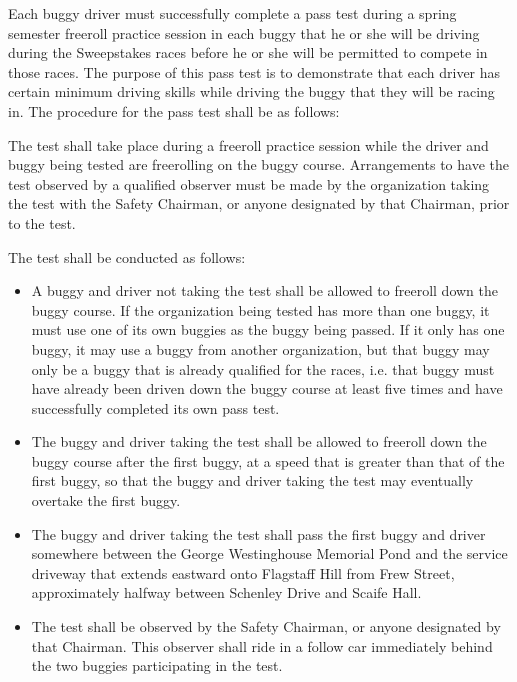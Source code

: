 	Each buggy driver must successfully complete a pass test during a spring
	semester freeroll practice session in each buggy that he or she will be driving
	during the Sweepstakes races before he or she will be permitted to compete in
	those races. The purpose of this pass test is to demonstrate that each driver
	has certain minimum driving skills while driving the buggy that they will be
	racing in. The procedure for the pass test shall be as follows:

	The test shall take place during a freeroll practice session while the driver
	and buggy being tested are freerolling on the buggy course. Arrangements to
	have the test observed by a qualified observer must be made by the organization
	taking the test with the Safety Chairman, or anyone designated by that
	Chairman, prior to the test.

	The test shall be conducted as follows:

	\begin{itemize}

		\item A buggy and driver not taking the test shall be allowed to freeroll
		down the buggy course. If the organization being tested has more than one
		buggy, it must use one of its own buggies as the buggy being passed. If it only
		has one buggy, it may use a buggy from another organization, but that buggy may
		only be a buggy that is already qualified for the races, i.e. that buggy must
		have already been driven down the buggy course at least five times and have
		successfully completed its own pass test.

		\item The buggy and driver taking the test shall be allowed to freeroll
		down the buggy course after the first buggy, at a speed that is greater than
		that of the first buggy, so that the buggy and driver taking the test may
		eventually overtake the first buggy.

		\item The buggy and driver taking the test shall pass the first buggy and
		driver somewhere between the George Westinghouse Memorial Pond and the service
		driveway that extends eastward onto Flagstaff Hill from Frew Street,
		approximately halfway between Schenley Drive and Scaife Hall.

		\item The test shall be observed by the Safety Chairman, or anyone
		designated by that Chairman. This observer shall ride in a follow car
		immediately behind the two buggies participating in the test.

	\end{itemize}

